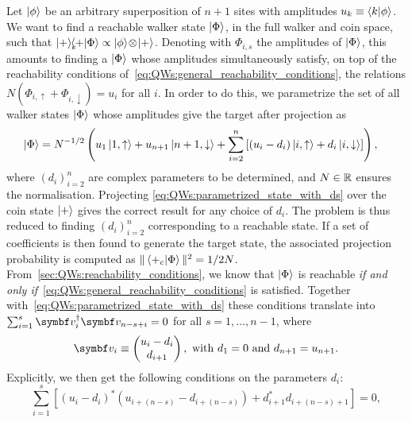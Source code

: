 Let $\ket\phi$ be an arbitrary superposition of $n+1$ sites with amplitudes $u_k \equiv \braket{k}{\phi}$.
We want to find a reachable walker state $\ket\Phi$, in the full walker and coin space, such that
$\ket{+}_c \!\!\!\!\braket{+}{\Phi} \propto \ket\phi \!\otimes\! \ket+$.
Denoting with $\Phi_{i,s}$ the amplitudes of $\ket\Phi$, this amounts to finding a $\ket\Phi$ whose amplitudes simultaneously satisfy, on top of the reachability conditions of~\cref{eq:QWs:general_reachability_conditions}, the relations
${N(\Phi_{i,\uparrow}+\Phi_{i,\downarrow})= u_i}$ for all $i$.
In order to do this, we parametrize the set of all walker states $\ket\Phi$ whose amplitudes give the target after projection as
\begin{equation}
\begin{aligned}
    \ket\Phi &= N^{-1/2} \left( u_1 \ket{1,\uparrow} + u_{n+1} \ket{n+1,\downarrow}
	+ \sum_{i=2}^n \left[
		(u_i - d_i) \ket{i, \uparrow} +
		d_i \ket{i, \downarrow}
	\right] \right),
\end{aligned}
\label{eq:QWs:parametrized_state_with_ds}
\end{equation}
where $(d_i)_{i=2}^n$ are complex parameters to be determined, and $N\in{\mathbb{R}}$ ensures the normalisation.
Projecting \cref{eq:QWs:parametrized_state_with_ds} over the coin state $\ket+$ gives the correct result for any choice of $d_i$.
The problem is thus reduced to finding $(d_i)_{i=2}^n$ corresponding to a reachable state.
If a set of coefficients is then found to generate the target state, the associated projection probability is computed as
$\|\braket{+_c}{\Phi}\|^2=1/2N$.
From~\cref{sec:QWs:reachability_conditions}, we know that $\ket\Phi$ is reachable \textit{if and only if}~\cref{eq:QWs:general_reachability_conditions} is satisfied. Together with~\cref{eq:QWs:parametrized_state_with_ds} these conditions translate into $\sum_{i=1}^{s} \bs v_i^\dagger \bs v_{n-s+i}=0$ for all $s=1,\dots,n-1$, where
\begin{equation}
    \bs v_i \equiv \begin{pmatrix}
        u_i - d_i \\ d_{i+1}
    \end{pmatrix},
    \text{ with } d_1 = 0 \text{ and } d_{n+1}=u_{n+1}.
\end{equation}
Explicitly, we then get the following conditions on the parameters $d_i$:
\begin{equation}
	\sum_{i=1}^s \left[
	  (u_i - d_i)^*
      (u_{i+(n-s)} - d_{i+(n-s)})
	  +
      d_{i+1}^* d_{i+(n-s)+1}
    \right]
	= 0,
	\label{eq:QWs:conditions_for_ds}
\end{equation}

